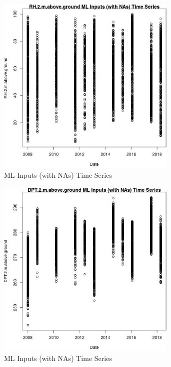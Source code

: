 \begin{figure} 
\centering  
\includegraphics[width=0.77\textwidth]{Code_Outputs/Report_ML_input_PM25_Step4_part_e_de_duplicated_aves_compiled_2019-05-18wNAs_RH2mabovegroundvDate.jpg} 
\caption{\label{fig:Report_ML_input_PM25_Step4_part_e_de_duplicated_aves_compiled_2019-05-18wNAsRH2mabovegroundvDate}ML Inputs (with NAs) Time Series} 
\end{figure} 
 

\begin{figure} 
\centering  
\includegraphics[width=0.77\textwidth]{Code_Outputs/Report_ML_input_PM25_Step4_part_e_de_duplicated_aves_compiled_2019-05-18wNAs_DPT2mabovegroundvDate.jpg} 
\caption{\label{fig:Report_ML_input_PM25_Step4_part_e_de_duplicated_aves_compiled_2019-05-18wNAsDPT2mabovegroundvDate}ML Inputs (with NAs) Time Series} 
\end{figure} 
 

